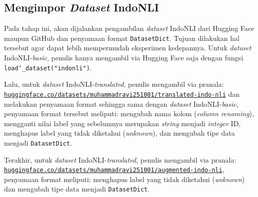 \subsection{Mengimpor \emph{Dataset} IndoNLI}
\label{4.1.3}
Pada tahap ini, akan dijalankan pengambilan \emph{dataset} IndoNLI dari Hugging Face maupun GitHub dan penyamaan format \texttt{DatasetDict}. Tujuan dilakukan hal tersebut agar dapat lebih mempermudah eksperimen kedepannya. Untuk \emph{dataset} IndoNLI-\emph{basic}, penulis hanya mengambil via Hugging Face saja dengan fungsi \texttt{load\char`_dataset("indonli")}. 

Lalu, untuk \emph{dataset} IndoNLI-\emph{translated}, penulis mengambil via pranala: \href{https://huggingface.co/datasets/muhammadravi251001/translated-indo-nli}{\texttt{huggingface.co/datasets/muhammadravi251001/translated-indo-nli}} dan melakukan penyamaan format sehingga sama dengan \emph{dataset} IndoNLI-\emph{basic}, penyamaan format tersebut meliputi: mengubah nama kolom (\emph{column renaming}), mengganti nilai label yang sebelumnya merupakan \emph{string} menjadi \emph{integer} ID, menghapus label yang tidak diketahui (\emph{unknown}), dan mengubah tipe data menjadi \texttt{DatasetDict}. 

Terakhir, untuk \emph{dataset} IndoNLI-\emph{translated}, penulis mengambil via pranala: \href{https://huggingface.co/datasets/muhammadravi251001/augmented-indo-nli}{\texttt{huggingface.co/datasets/muhammadravi251001/augmented-indo-nli}}, penyamaan format meliputi: menghapus label yang tidak diketahui (\emph{unknown}) dan mengubah tipe data menjadi \texttt{DatasetDict}.

